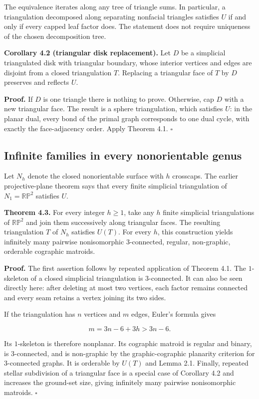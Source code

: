 \documentclass[11pt]{article}
\begin{document}
The equivalence iterates along any tree of triangle sums. In particular, a
triangulation decomposed along separating nonfacial triangles satisfies $U$
if and only if every capped leaf factor does. The statement does not require
uniqueness of the chosen decomposition tree.

\textbf{Corollary 4.2 (triangular disk replacement).} Let $D$ be a simplicial
triangulated disk with triangular boundary, whose interior vertices and edges
are disjoint from a closed triangulation $T$. Replacing a triangular face of
$T$ by $D$ preserves and reflects $U$.

\textbf{Proof.} If $D$ is one triangle there is nothing to prove. Otherwise, cap
$D$ with a new triangular face. The result is a sphere triangulation, which
satisfies $U$: in the planar dual, every bond of the primal graph corresponds
to one dual cycle, with exactly the face-adjacency order. Apply Theorem 4.1.
$\square$

\subsection{Infinite families in every nonorientable genus}


Let $N_h$ denote the closed nonorientable surface with $h$ crosscaps. The
earlier projective-plane theorem \cite{carptopus-rp2} says that every finite simplicial
triangulation of $N_1=\mathbb{RP}^2$ satisfies $U$.

\textbf{Theorem 4.3.} For every integer $h\geq1$, take any $h$ finite simplicial
triangulations of $\mathbb{RP}^2$ and join them successively along triangular
faces. The resulting triangulation $T$ of $N_h$ satisfies $U(T)$. For every
$h$, this construction yields infinitely many pairwise nonisomorphic
$3$-connected, regular, non-graphic, orderable cographic matroids.

\textbf{Proof.} The first assertion follows by repeated application of Theorem
4.1. The $1$-skeleton of a closed simplicial triangulation is $3$-connected.
It can also be seen directly here: after deleting at most two vertices, each
factor remains connected and every seam retains a vertex joining its two
sides.

If the triangulation has $n$ vertices and $m$ edges, Euler's formula gives

\[
m=3n-6+3h>3n-6.
\]

Its $1$-skeleton is therefore nonplanar. Its cographic matroid is regular and
binary, is $3$-connected, and is non-graphic by the graphic-cographic
planarity criterion for $3$-connected graphs. It is orderable by $U(T)$ and
Lemma 2.1. Finally, repeated stellar subdivision of a triangular face is a
special case of Corollary 4.2 and increases the ground-set size, giving
infinitely many pairwise nonisomorphic matroids. $\square$
\end{document}
